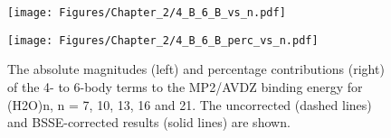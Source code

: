 \begin{figure}[h]
\uwsinglespace
\begin{center}
\begin{minipage}{0.45\textwidth}
\texttt{[image: Figures/Chapter\_2/4\_B\_6\_B\_vs\_n.pdf]}
\end{minipage}
\begin{minipage}{0.45\textwidth}
\texttt{[image: Figures/Chapter\_2/4\_B\_6\_B\_perc\_vs\_n.pdf]}
\end{minipage}
\end{center}
\caption[The absolute magnitudes (left) and percentage contributions (right) of the 4- to 6-body terms to the MP2/AVDZ binding energy for (H2O)n, n = 7, 10, 13, 16 and 21. The uncorrected (dashed lines) and BSSE-corrected results (solid lines) are shown.]{The absolute magnitudes (left) and percentage contributions (right) of the 4- to 6-body terms to the MP2/AVDZ binding energy for (H2O)n, n = 7, 10, 13, 16 and 21. The uncorrected (dashed lines) and BSSE-corrected results (solid lines) are shown.}
\label{fig:MBE_I_F5}
\end{figure}